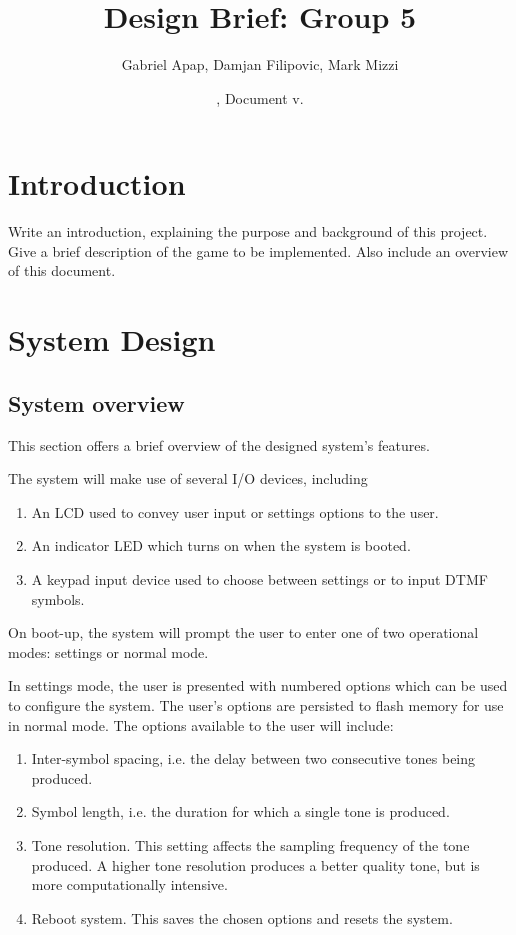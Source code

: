 \documentclass[11pt,a4paper
]{scrartcl}
\title{Design Brief: Group 5}
\author{
   Gabriel Apap,
   Damjan Filipovic,
   Mark Mizzi
   }
\date{\svnMaxToday, Document v.\svnInfoMaxRevision}
\begin{document}
\maketitle


\section{Introduction}
Write an introduction, explaining the purpose and background of this project.
Give a brief description of the game to be implemented.
Also include an overview of this document.

\section{System Design}

\subsection{System overview}

This section offers a brief overview of the designed system's features.

The system will make use of several I/O devices, including
\begin{enumerate}
   \item An LCD used to convey user input or settings options to the user.
   \item An indicator LED which turns on when the system is booted.
   \item A keypad input device used to choose between settings or to input DTMF symbols.
\end{enumerate}

On boot-up, the system will prompt the user to enter one of two operational modes: settings or normal mode.

In settings mode, the user is presented with numbered options which can be used to configure the system. 
The user's options are persisted to flash memory for use in normal mode.
The options available to the user will include:

\begin{enumerate}
   \item Inter-symbol spacing, i.e. the delay between two consecutive tones being produced.
   \item Symbol length, i.e. the duration for which a single tone is produced.
   \item Tone resolution. This setting affects the sampling frequency of the tone produced. A higher tone resolution produces a better quality tone, but is more computationally intensive.
   \item Reboot system. This saves the chosen options and resets the system.
\end{enumerate}
\end{document}
